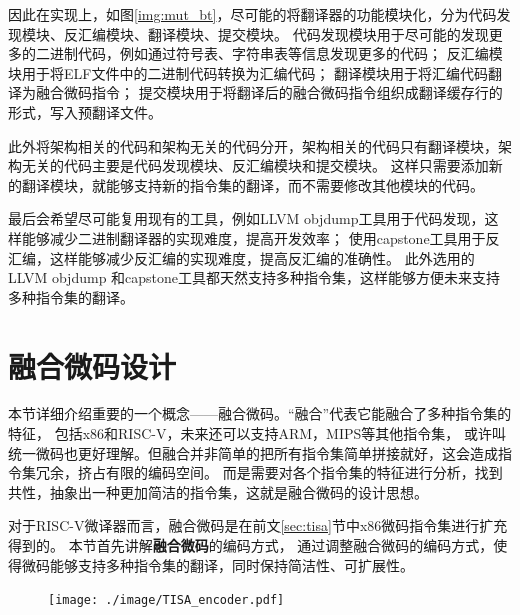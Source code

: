 因此在实现上，如图\ref{img:mut_bt}，尽可能的将翻译器的功能模块化，分为代码发现模块、反汇编模块、翻译模块、提交模块。
代码发现模块用于尽可能的发现更多的二进制代码，例如通过符号表、字符串表等信息发现更多的代码；
反汇编模块用于将ELF文件中的二进制代码转换为汇编代码；
翻译模块用于将汇编代码翻译为融合微码指令；
提交模块用于将翻译后的融合微码指令组织成翻译缓存行的形式，写入预翻译文件。

此外将架构相关的代码和架构无关的代码分开，架构相关的代码只有翻译模块，架构无关的代码主要是代码发现模块、反汇编模块和提交模块。
这样只需要添加新的翻译模块，就能够支持新的指令集的翻译，而不需要修改其他模块的代码。

最后会希望尽可能复用现有的工具，例如LLVM objdump工具用于代码发现，这样能够减少二进制翻译器的实现难度，提高开发效率；
使用capstone工具用于反汇编，这样能够减少反汇编的实现难度，提高反汇编的准确性。
此外选用的LLVM objdump 和capstone工具都天然支持多种指令集，这样能够方便未来支持多种指令集的翻译。




\section{融合微码设计}

本节详细介绍重要的一个概念——融合微码。“融合”代表它能融合了多种指令集的特征，
包括x86和RISC-V，未来还可以支持ARM，MIPS等其他指令集，
或许叫统一微码也更好理解。但融合并非简单的把所有指令集简单拼接就好，这会造成指令集冗余，挤占有限的编码空间。
而是需要对各个指令集的特征进行分析，找到共性，抽象出一种更加简洁的指令集，这就是融合微码的设计思想。

对于RISC-V微译器而言，融合微码是在前文\ref{sec:tisa}节中x86微码指令集进行扩充得到的。
本节首先讲解\textbf{融合微码}的编码方式，
通过调整融合微码的编码方式，使得微码能够支持多种指令集的翻译，同时保持简洁性、可扩展性。

\begin{figure}[!htbp]
  \centering
  \texttt{[image: ./image/TISA\_encoder.pdf]}
  \label{img:TISA_encoder}
\end{figure}

